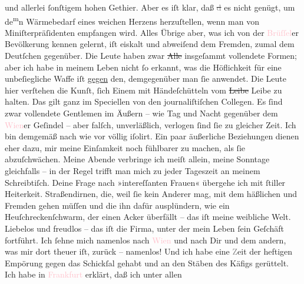 \documentclass[twoside=false,titlepage=false,open=any, parskip=never, fontsize=12pt, headings=small, chapterprefix=false, appendixprefix=false]{scrbook}
\newcommand{\strikeout}[1]{\sout{#1}}
\newcommand{\Theight}{\dimexpr\fontcharht\font`W}
\newcommand{\pbposition}{\depth}
\newcommand{\pb}{\nobreak\hspace{0pt}\raisebox{-0.1em}{\raisebox{\pbposition}{\textnormal{|}}}\nobreak\hspace{0pt}}
\newcommand{\substVorne}{\textnormal{\raisebox{\Theight}{\raisebox{-\height}{\rotatebox[origin=c]{180}{v}\normalsize}}}}
\newcommand{\substDazwischen}{}
\newcommand{\substHinten}{\textnormal{\raisebox{\Theight}{\raisebox{-\height}{\small{v}\normalsize}}}}
\begin{document}
               und allerlei ſonſtigem hohen Gethier. Aber es iſt klar, daß \strikeout{\textcolor{gray}{d}} es nicht genügt, um de\substVorne{}\textsuperscript{m}\substDazwischen{}n\substHinten{} Wärmebedarf eines weichen Herzens herzuſtellen, wenn man von
               Miniſterpräſidenten empfangen wird. Alles Übrige aber, was ich von der \textcolor{pink}{Brüſſel}{}\ledrightnote{\textcolor{pink}{Brüssel}}er Bevölkerung kennen gelernt, iſt eiskalt
               und abweiſend dem Fremden, zumal dem Deutſchen gegenüber. Die Leute haben zwar \strikeout{Alle} insgeſammt vollendete Formen; aber ich habe in
               meinem Leben nicht ſo erkannt, was die Höflichkeit für eine unbeſiegliche {\pb}Waffe iſt \uline{gegen} den,
               demgegenüber man ſie anwendet. Die Leute hier verſtehen die Kunſt, ſich Einem mit
               Händeſchütteln vom \strikeout{Leibe} Leibe zu halten. Das gilt
               ganz im Speciellen von den journaliſtiſchen Collegen. Es ſind zwar vollendete
               Gentlemen im Äußern – wie Tag und Nacht gegenüber dem \textcolor{pink}{Wien}{}\ledrightnote{\textcolor{pink}{Wien}}er Geſindel – aber falſch, unverläßlich, verlogen ſind ſie zu gleicher
               Zeit. Ich bin demgemäß nach wie vor völlig iſolirt. Ein paar äußerliche Beziehungen
               dienen eher dazu, mir meine Einſamkeit noch fühlbarer zu machen, als ſie
               abzuſchwächen. Meine Abende verbringe ich meiſt allein, meine Sonntage gleichfalls –
               in der Regel trifft man mich zu jeder Tageszeit an meinem Schreibtiſch. Deine Frage
               nach »intereſſanten Frauen« übergehe ich mit ſtiller Heiterkeit. Straßendirnen, die,
               weil ſie kein Anderer mag, mit dem häßlichen und \label{K_L02668-13v}\label{K_L02668-13h} Fremden gehen müſſen und die ihn dafür ausplündern, wie ein
               Heuſchreckenſchwarm, der einen Acker überfällt – das iſt meine {\pb}weibliche Welt. Liebelos und freudlos – das iſt die
               Firma, unter der mein Leben ſein Geſchäft fortführt. Ich ſehne mich namenlos nach \textcolor{pink}{Wien}{}\ledrightnote{\textcolor{pink}{Wien}} und nach Dir und dem andern, was mir dort
               theuer iſt, zurück – namenlos! Und ich habe eine \textcolor{gray}{Z}eit der heftigen
               Empörung gegen das Schickſal gehabt und an den Stäben des Käfigs gerüttelt. Ich habe
               in \textcolor{pink}{Frankfurt}{}\ledrightnote{\textcolor{pink}{Frankfurt am Main}} erklärt, daß ich unter allen
\end{document}
